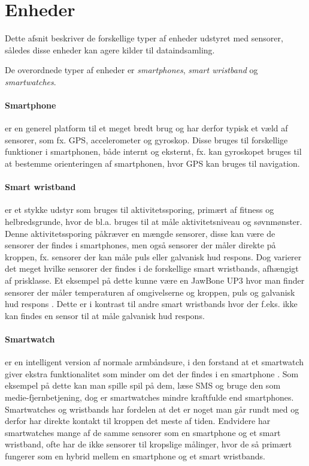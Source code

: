 \section{Enheder}\label{sec:kilder-til-sensorer}
Dette afsnit beskriver de forskellige typer af enheder udstyret med sensorer, således disse enheder kan agere kilder til dataindsamling.

De overordnede typer af enheder er \textit{smartphones}, \textit{smart wristband} og \textit{smartwatches}. 

\paragraph{Smartphone}
er en generel platform til et meget bredt brug og har derfor typisk et væld af sensorer, som fx. GPS, accelerometer og gyroskop.
Disse bruges til forskellige funktioner i smartphonen, både internt og eksternt, fx. kan gyroskopet bruges til at bestemme orienteringen af smartphonen, hvor GPS kan bruges til navigation.

\paragraph{Smart wristband} %
er et stykke udstyr som bruges til aktivitetssporing, primært af fitness og helbredsgrunde, hvor de bl.a. bruges til at måle aktivitetsniveau og søvnmønster.
Denne aktivitetssporing påkræver en mængde sensorer, disse kan være de sensorer der findes i smartphones, men også sensorer der måler direkte på kroppen, fx. sensorer der kan måle puls eller galvanisk hud respons. 
Dog varierer det meget hvilke sensorer der findes i de forskellige smart wristbands, afhængigt af prisklasse.
Et eksempel på dette kunne være en JawBone UP3 hvor man finder sensorer der måler temperaturen af omgivelserne og kroppen, puls og galvanisk hud respons \citep{misc:jawboneup3sensors}. 
Dette er i kontrast til andre smart wristbands hvor der f.eks. ikke kan findes en sensor til at måle galvanisk hud respons.

\paragraph{Smartwatch}
er en intelligent version af normale armbåndsure, i den forstand at et smartwatch giver ekstra funktionalitet som minder om det der findes i en smartphone \citep{msic:smartwatchstate}. 
Som eksempel på dette kan man spille spil på dem, læse SMS og bruge den som medie-fjernbetjening, dog er smartwatches mindre kraftfulde end smartphones. 
Smartwatches og wristbands har fordelen at det er noget man går rundt med og derfor har direkte kontakt til kroppen det meste af tiden.
Endvidere har smartwatches mange af de samme sensorer som en smartphone og et smart wristband, ofte har de ikke sensorer til kropslige målinger, hvor de så primært fungerer som en hybrid mellem en smartphone og et smart wristbands.

